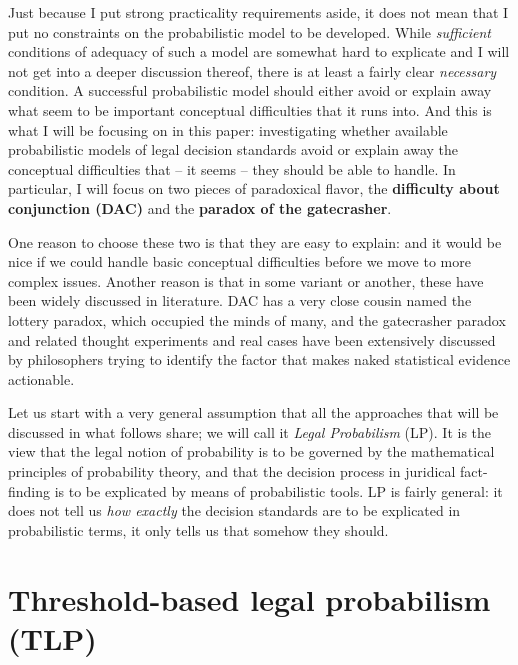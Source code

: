 \documentclass{ifcolog}
\begin{document}
Just because I put strong practicality requirements aside, it does not mean that I put no constraints on the probabilistic model to be developed. While \emph{sufficient} conditions of adequacy of such a model are somewhat hard to explicate and I will not get into a deeper discussion thereof, there is at least a fairly clear \emph{necessary} condition. A successful probabilistic model should either avoid or explain away what seem to be important conceptual difficulties that it runs into. And this is what I will be focusing on in this paper: investigating whether available probabilistic models of legal decision standards avoid or explain away the conceptual difficulties that -- it seems -- they should be able to handle. In particular, I will focus on two pieces of paradoxical flavor, the \textbf{difficulty about conjunction (DAC)} and the \textbf{paradox of the gatecrasher}.

 One reason to choose these two is that they are easy to explain: and it would be nice if we could handle basic conceptual difficulties  before we move to more complex issues. Another reason is that in some variant or another, these have been widely discussed in literature. DAC has a very close cousin named the lottery paradox, which occupied the minds of many, and the gatecrasher paradox and related thought experiments and real cases have been extensively discussed by philosophers trying to identify the factor that makes naked statistical evidence actionable. 




Let us start with a very general assumption that all the approaches that will be discussed in what follows share; we will call it \emph{Legal Probabilism} (LP). It   is the view that the legal notion of probability is to be governed by the  mathematical principles of  probability theory, and that the decision process in juridical fact-finding is to be explicated by means of probabilistic tools.  LP is fairly general: it does not tell us \emph{ how exactly } the decision standards are to be explicated in probabilistic terms, it only tells us that somehow they should. 




\section{Threshold-based legal probabilism (TLP)}\label{sec:threshold-based}
\end{document}
